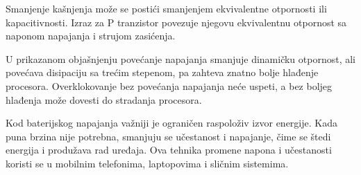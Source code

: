 Smanjenje kašnjenja može se postići smanjenjem ekvivalentne otpornosti ili kapacitivnosti. Izraz za P tranzistor povezuje njegovu ekvivalentnu otpornost sa naponom napajanja i strujom zasićenja.

U prikazanom objašnjenju povećanje napajanja smanjuje dinamičku otpornost, ali povećava disipaciju sa trećim stepenom, pa zahteva znatno bolje hlađenje procesora. Overklokovanje bez povećanja napajanja neće uspeti, a bez boljeg hlađenja može dovesti do stradanja procesora.

Kod baterijskog napajanja važniji je ograničen raspoloživ izvor energije. Kada puna brzina nije potrebna, smanjuju se učestanost i napajanje, čime se štedi energija i produžava rad uređaja. Ova tehnika promene napona i učestanosti koristi se u mobilnim telefonima, laptopovima i sličnim sistemima.
